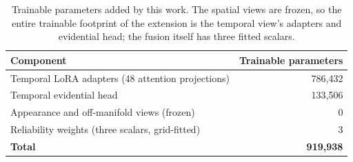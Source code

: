 \begin{table}[t]
\centering
\caption{Trainable parameters added by this work. The spatial views are frozen, so the entire trainable footprint of the extension is the temporal view's adapters and evidential head; the fusion itself has three fitted scalars.}
\label{tab:efficiency}
\small
\begin{tabular}{lr}
\toprule
Component & Trainable parameters \\
\midrule
Temporal LoRA adapters (48 attention projections) & 786,432 \\
Temporal evidential head & 133,506 \\
Appearance and off-manifold views (frozen) & 0 \\
Reliability weights (three scalars, grid-fitted) & 3 \\
\midrule
\textbf{Total} & \textbf{919,938} \\
\bottomrule
\end{tabular}
\end{table}
